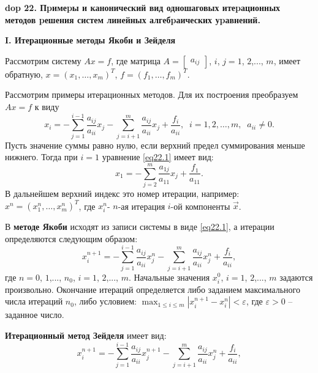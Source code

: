 \setcounter{section}{4}
\setcounter{subsection}{22}
\setcounter{equation}{0}
\textbf{\LARGE dop 22. Пpимеpы и канонический вид одношаговых итеpационных методов pешения систем линейных алгебpаических уpавнений.}

\textbf{I. Итерационные методы Якоби и Зейделя}

\par Рассмотрим систему $Ax=f$, где матрица $A=\begin{bmatrix}a_{ij}\end{bmatrix}$, $i$, $j=1$, $2$,..., $m$, имеет обратную, $x=\left( x_{1},\ldots ,x_{m}\right) ^{T}$, $f=\left( f_{1},\ldots ,f_{m}\right) ^{T}$.
\par Рассмотрим примеры итерационных методов. Для их построения преобразуем $Ax=f$ к виду 
\begin{equation} \label{eq22.1}
    x_{i}=-\sum ^{i-1}_{j=1}\dfrac{a_{ij}}{a_{ii}}x_{j}-\sum ^{m}_{j=i+1}\dfrac{a_{ij}}{a_{ii}}x_{j}+\dfrac{f_{i}}{a_{ii}},\;\; i=1, 2,\ldots, m, \;\;a_{ii}\neq 0. 
\end{equation}
Пусть значение суммы равно нулю, если верхний предел суммирования меньше нижнего. Тогда при $i=1$ уравнение \eqref{eq22.1} имеет вид: 
$$x_{1}=-\sum ^{m}_{j=2}\dfrac{a_{1j}}{a_{11}}x_{j}+\dfrac{f_{1}}{a_{11}}.$$ 
В дальнейшем верхний индекс это номер итерации, например: $x^{n}=\left( x_{1}^{n},\ldots ,x_{m}^{n}\right) ^{T}$, где $x_{i}^{n}$- $n$-ая итерация $i$-ой компоненты $\overrightarrow{x}$.\\
\par В \textbf{методе Якоби} исходят из записи системы в виде \eqref{eq22.1}, а итерации определяются следующим образом:
\begin{equation}\label{eq22.5}
   x_{i}^{n+1}=-\sum ^{i-1}_{j=1}\dfrac{a_{ij}}{a_{ii}}x_{j}^{n}-\sum ^{m}_{j=i+1}\dfrac{a_{ij}}{a_{ii}}x_{j}^{n}+\dfrac{f_{i}}{a_{ii}},
\end{equation}
где $n=0$, $1$,..., $n_{0}$, $i=1$, $2$,..., $m$. Начальные значения $x_{i}^{0}$, $i=1$, $2$,..., $m$ задаются произвольно. Окончание итераций определяется либо заданием максимального числа итераций $n_{0}$, либо условием: $\max_{1\leq i\leq m} \left| x_{i}^{n+1}-x_{i}^{n}\right| <\varepsilon$, где $\varepsilon>0$ -- заданное число.\\
\par\textbf{Итерационный метод Зейделя} имеет вид: 
\begin{equation}\label{eq22.2}
    x_{i}^{n+1}=-\sum ^{i-1}_{j=1}\dfrac{a_{ij}}{a_{ii}}x_{j}^{n+1}-\sum ^{m}_{j=i+1}\dfrac{a_{ij}}{a_{ii}}x_{j}^{n}+\dfrac{f_{i}}{a_{ii}},
\end{equation}
